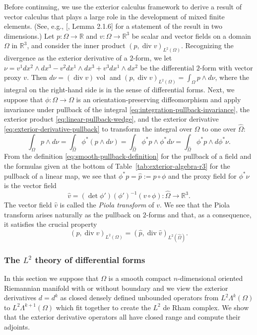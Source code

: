{Before continuing, we use the exterior calculus framework to derive a result of vector calculus that plays a large role in the development of mixed finite elements. (See, e.g., [, Lemma 2.1.6] for a statement of the result in two dimensions.) Let $p:\Omega\to\mathbb R$ and $v:\Omega\to\mathbb R^3$ be scalar and vector fields on a domain $\Omega$ in $\mathbb R^3$, and consider the inner product $(p,\operatorname{div}v)_{L^2(\Omega)}$. Recognizing the divergence as the exterior derivative of a $2$-form, we let $\nu=v^1dx^2\wedge dx^3-v^2dx^1\wedge dx^3+v^3dx^1\wedge dx^2$ be the differential $2$-form with vector proxy $v$. Then $d\nu=(\operatorname{div}v)\operatorname{vol}$ and $(p,\operatorname{div}v)_{L^2(\Omega)}=\int_\Omega p\wedge d\nu$, where the integral on the right-hand side is in the sense of differential forms. Next, we suppose that $\phi:\widehat\Omega\to\Omega$ is an orientation-preserving diffeomorphism and apply invariance under pullback of the integral \eqref{eq:integration-pullback-invariance}, the exterior product \eqref{eq:linear-pullback-wedge}, and the exterior derivative \eqref{eq:exterior-derivative-pullback} to transform the integral over $\Omega$ to one over $\widehat\Omega$:}
\[
\int_\Omega p\wedge d\nu=\int_{\widehat\Omega}\phi^*(p\wedge d\nu)=\int_{\widehat\Omega}\phi^*p\wedge\phi^*d\nu=\int_{\widehat\Omega}\phi^*p\wedge d\phi^*\nu.
\]
{From the definition \eqref{eq:smooth-pullback-definition} for the pullback of a field and the formulas given at the bottom of Table~\ref{tab:exterior-algebra-r3} for the pullback of a linear map, we see that $\phi^*p=\hat p:=p\circ\phi$ and the proxy field for $\phi^*\nu$ is the vector field}
\[
\hat v=(\det\phi')(\phi')^{-1}(v\circ\phi):\widehat\Omega\to\mathbb R^3.
\]
{The vector field $\hat v$ is called the \emph{Piola transform} of $v$. We see that the Piola transform arises naturally as the pullback on $2$-forms and that, as a consequence, it satisfies the crucial property}
\[
(p,\operatorname{div}v)_{L^2(\Omega)}=(\hat p,\operatorname{div}\hat v)_{L^2(\widehat\Omega)}.
\]

\subsubsection{{The $L^2$ theory of differential forms}}\label{subsec:differential-forms-l2-theory}

{In this section we suppose that $\Omega$ is a smooth compact $n$-dimensional oriented Riemannian manifold with or without boundary and we view the exterior derivatives $d=d^k$ as closed densely defined unbounded operators from $L^2\Lambda^k(\Omega)$ to $L^2\Lambda^{k+1}(\Omega)$ which fit together to create the $L^2$ de Rham complex. We show that the exterior derivative operators all have closed range and compute their adjoints.}


